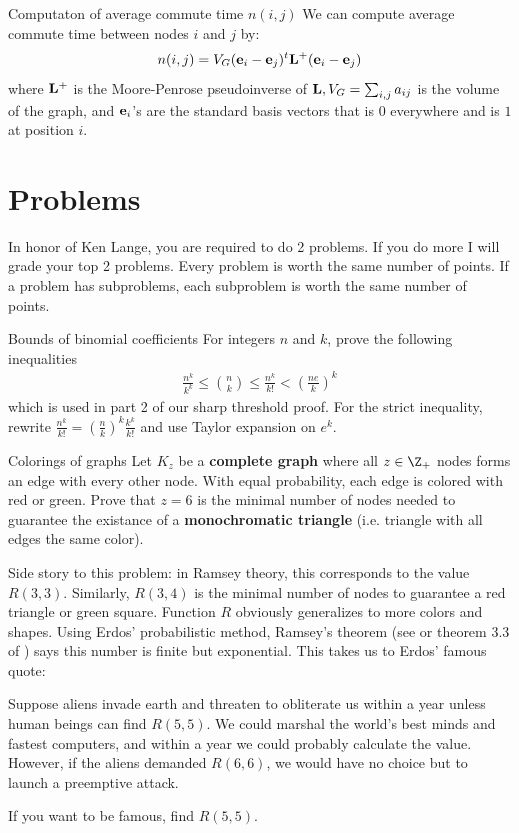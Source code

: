 \documentclass[./some_latex_template.tex]{subfiles}
\begin{document}
\begin{theorembox}{Computaton of average commute time $n(i, j)$}{}
We can compute average commute time between nodes $i$ and $j$ by:
\begin{align*}
	n(i, j) = V_G (\mathbf{e}_i - \mathbf{e}_j)^t\mathbf{L}^+(\mathbf{e}_i - \mathbf{e}_j)
\end{align*}
where $\mathbf{L}^+$ is the Moore-Penrose pseudoinverse of $\mathbf{L}, V_G = \sum_{i,j} a_{ij}$ is the volume of the graph, and $\mathbf{e}_i$'s are the standard basis vectors that is $0$ everywhere and is $1$ at position $i$. 
\end{theorembox}




\section{Problems}

In honor of Ken Lange, you are required to do 2 problems. If you do more I will grade your top 2 problems. Every problem is worth the same number of points. If a problem has subproblems, each subproblem is worth the same number of points.

\begin{problembox}{Bounds of binomial coefficients}{}
For integers $n$ and $k$, prove the following inequalities
\begin{align*}
	\frac{n^k}{k^k} \le {n \choose k} \le \frac{n^k}{k!} < \left( \frac{ne}{k}\right)^k
\end{align*}
which is used in part 2 of our sharp threshold proof. For the strict inequality, rewrite $\frac{n^k}{k!} = \left(\frac{n}{k}\right)^k \frac{k^k}{k!}$ and use Taylor expansion on $e^k$.
\end{problembox}

\begin{problembox}{Colorings of graphs}{}
Let $K_z$ be a \textbf{complete graph} where all $z \in \Z_+$ nodes forms an edge with every other node. With equal probability, each edge is colored with red or green. Prove that $z=6$ is the minimal number of nodes needed to guarantee the existance of a \textbf{monochromatic triangle} (i.e. triangle with all edges the same color).
\end{problembox}
Side story to this problem: in Ramsey theory, this corresponds to the value $R(3, 3)$. Similarly, $R(3, 4)$ is the minimal number of nodes to guarantee a red triangle or green square. Function $R$ obviously generalizes to more colors and shapes. Using Erdos' probabilistic method, Ramsey's theorem (see \cite{sebv} or theorem 3.3 of \cite{van2001course}) says this number is finite but exponential.  This takes us to Erdos' famous quote:

\begin{displayquote}
Suppose aliens invade earth and threaten to obliterate us within a year unless human beings can find $R(5, 5)$. We could marshal the world's best minds and fastest computers, and within a year we could probably calculate the value. However, if the aliens demanded $R(6, 6)$, we would have no choice but to launch a preemptive attack.
\end{displayquote}
If you want to be famous, find $R(5, 5)$. 


\end{document}
